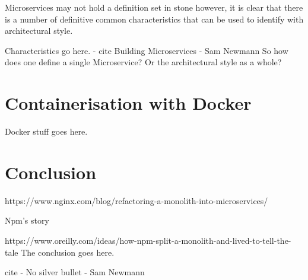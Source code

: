\documentclass[journal]{IEEEtran}
\begin{document}
Microservices may not hold a definition set in stone however, it is clear that there is a number of definitive common characteristics that can be used to identify with architectural style.



Characteristics go here. - cite Building Microservices - Sam Newmann
So how does one define a single Microservice? Or the architectural style as a whole? 


\section{Containerisation with Docker}

Docker stuff goes here.\cite{docker}

\section{Conclusion}


https://www.nginx.com/blog/refactoring-a-monolith-into-microservices/

Npm’s story

https://www.oreilly.com/ideas/how-npm-split-a-monolith-and-lived-to-tell-the-tale
The conclusion goes here.

cite - No silver bullet - Sam Newmann

\printbibliography

\end{document}
